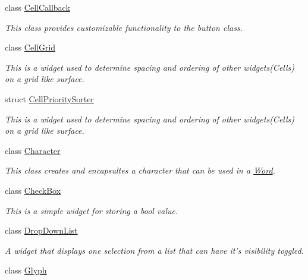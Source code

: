 \begin{DoxyCompactItemize}
class \hyperlink{classMezzanine_1_1UI_1_1CellCallback}{CellCallback}
\begin{DoxyCompactList}\small\item\em This class provides customizable functionality to the button class. \item\end{DoxyCompactList}\item 
class \hyperlink{classMezzanine_1_1UI_1_1CellGrid}{CellGrid}
\begin{DoxyCompactList}\small\item\em This is a widget used to determine spacing and ordering of other widgets(Cells) on a grid like surface. \item\end{DoxyCompactList}\item 
struct \hyperlink{structMezzanine_1_1UI_1_1CellPrioritySorter}{CellPrioritySorter}
\begin{DoxyCompactList}\small\item\em This is a widget used to determine spacing and ordering of other widgets(Cells) on a grid like surface. \item\end{DoxyCompactList}\item 
class \hyperlink{structMezzanine_1_1UI_1_1Character}{Character}
\begin{DoxyCompactList}\small\item\em This class creates and encapsultes a character that can be used in a \hyperlink{classMezzanine_1_1UI_1_1Word}{Word}. \item\end{DoxyCompactList}\item 
class \hyperlink{classMezzanine_1_1UI_1_1CheckBox}{CheckBox}
\begin{DoxyCompactList}\small\item\em This is a simple widget for storing a bool value. \item\end{DoxyCompactList}\item 
class \hyperlink{classMezzanine_1_1UI_1_1DropDownList}{DropDownList}
\begin{DoxyCompactList}\small\item\em A widget that displays one selection from a list that can have it's visibility toggled. \item\end{DoxyCompactList}\item 
class \hyperlink{classMezzanine_1_1UI_1_1Glyph}{Glyph}

\end{DoxyCompactItemize}
